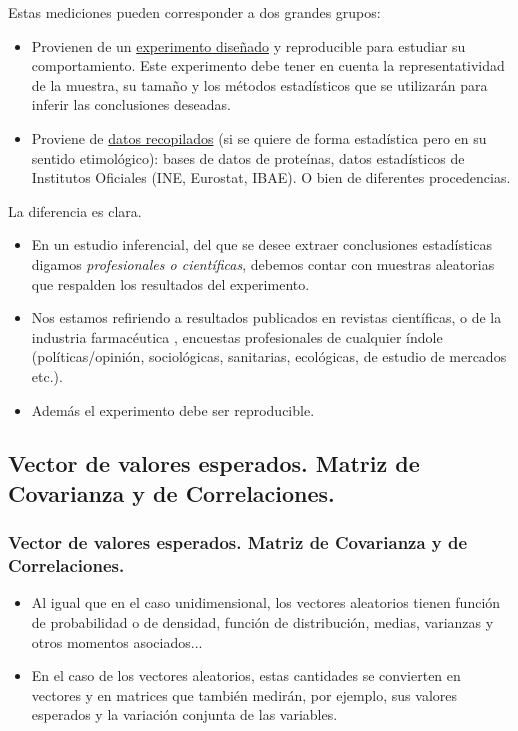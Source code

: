 \begin{frame}

Estas mediciones pueden corresponder a dos grandes grupos:

\begin{itemize}
\item Provienen de un \underline{experimento diseñado}  y reproducible para estudiar su comportamiento. Este experimento debe tener en cuenta la representatividad de la muestra, su tamaño y los métodos estadísticos que se utilizarán para inferir las conclusiones deseadas.
\item Proviene de \underline{datos recopilados} (si se quiere de forma estadística pero en su sentido etimológico): bases de datos de proteínas, datos estadísticos de Institutos Oficiales (INE, Eurostat, IBAE). O bien de diferentes procedencias.
\end{itemize}

\end{frame}

\begin{frame}

La diferencia es clara.

\begin{itemize}
\item  En un estudio inferencial, del que se desee extraer conclusiones estadísticas digamos \textsl{profesionales o científicas}, debemos contar con muestras aleatorias que respalden  los resultados del experimento.
\item  Nos estamos refiriendo a resultados publicados en revistas científicas, o  de la industria farmacéutica , encuestas profesionales de cualquier índole (políticas/opinión, sociológicas, sanitarias, ecológicas, de estudio de mercados etc.). 
\item Además el experimento debe ser reproducible.
\end{itemize}
\end{frame}
\subsection{Vector de valores esperados. Matriz de Covarianza y de Correlaciones.}

\begin{frame}
\frametitle{Vector de valores esperados. Matriz de Covarianza y de Correlaciones.}

\begin{itemize}
\item Al igual que en el caso unidimensional, los vectores aleatorios tienen función de probabilidad o de densidad, función de distribución, medias, varianzas y otros momentos asociados...
\item En el caso de los vectores aleatorios, estas cantidades se convierten en vectores y en matrices que también medirán, por ejemplo, sus valores esperados y la variación conjunta de las variables.
\end{itemize}
\end{frame}

